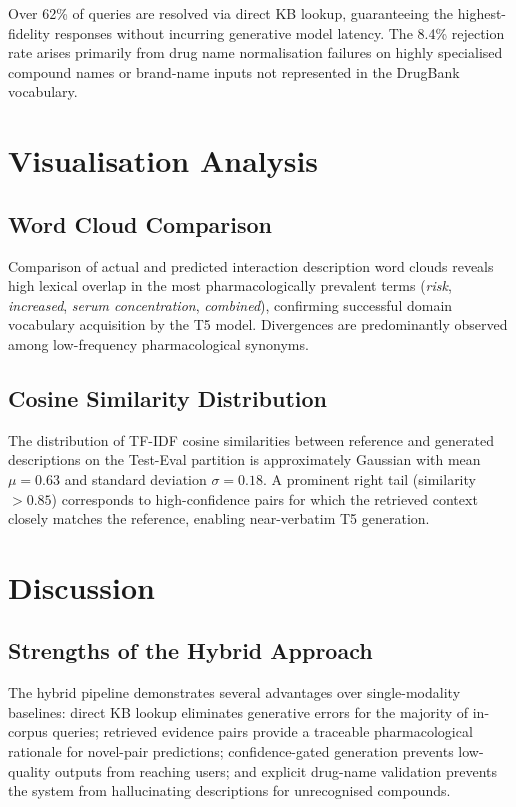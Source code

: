 \documentclass[12pt,a4paper,oneside]{report}
\begin{document}
Over 62\% of queries are resolved via direct KB lookup, guaranteeing the highest-fidelity
responses without incurring generative model latency. The 8.4\% rejection rate arises
primarily from drug name normalisation failures on highly specialised compound names or
brand-name inputs not represented in the DrugBank vocabulary.

\section{Visualisation Analysis}

\subsection{Word Cloud Comparison}

Comparison of actual and predicted interaction description word clouds reveals high lexical
overlap in the most pharmacologically prevalent terms (\textit{risk}, \textit{increased},
\textit{serum concentration}, \textit{combined}), confirming successful domain vocabulary
acquisition by the T5 model. Divergences are predominantly observed among low-frequency
pharmacological synonyms.

\subsection{Cosine Similarity Distribution}

The distribution of TF-IDF cosine similarities between reference and generated descriptions
on the Test-Eval partition is approximately Gaussian with mean $\mu = 0.63$ and standard
deviation $\sigma = 0.18$. A prominent right tail (similarity~$> 0.85$) corresponds to
high-confidence pairs for which the retrieved context closely matches the reference,
enabling near-verbatim T5 generation.

\section{Discussion}

\subsection{Strengths of the Hybrid Approach}

The hybrid pipeline demonstrates several advantages over single-modality baselines:
direct KB lookup eliminates generative errors for the majority of in-corpus queries;
retrieved evidence pairs provide a traceable pharmacological rationale for novel-pair
predictions; confidence-gated generation prevents low-quality outputs from reaching users;
and explicit drug-name validation prevents the system from hallucinating descriptions for
unrecognised compounds.
\end{document}
